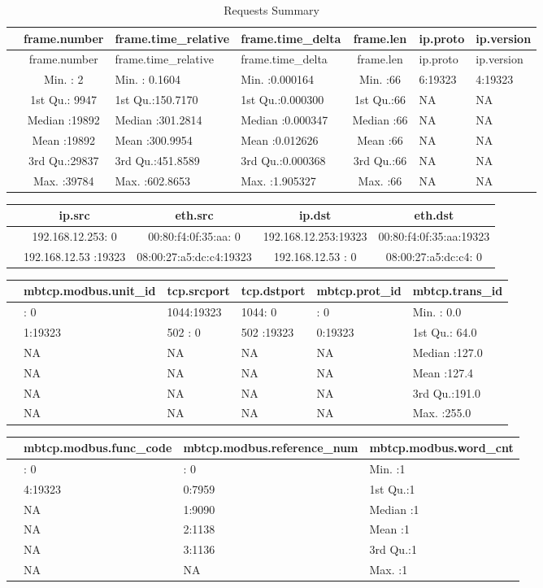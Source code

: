 \documentclass[11pt,a4paper]{article}
\begin{document}
\begin{longtable}[c]{@{}lcllcll@{}}
\caption{Requests Summary}\tabularnewline
\toprule
& frame.number & frame.time\_relative & frame.time\_delta & frame.len &
ip.proto & ip.version\tabularnewline
\midrule
\endfirsthead
\toprule
& frame.number & frame.time\_relative & frame.time\_delta & frame.len &
ip.proto & ip.version\tabularnewline
\midrule
\endhead
& Min. : 2 & Min. : 0.1604 & Min. :0.000164 & Min. :66 & 6:19323 &
4:19323\tabularnewline
& 1st Qu.: 9947 & 1st Qu.:150.7170 & 1st Qu.:0.000300 & 1st Qu.:66 & NA
& NA\tabularnewline
& Median :19892 & Median :301.2814 & Median :0.000347 & Median :66 & NA
& NA\tabularnewline
& Mean :19892 & Mean :300.9954 & Mean :0.012626 & Mean :66 & NA &
NA\tabularnewline
& 3rd Qu.:29837 & 3rd Qu.:451.8589 & 3rd Qu.:0.000368 & 3rd Qu.:66 & NA
& NA\tabularnewline
& Max. :39784 & Max. :602.8653 & Max. :1.905327 & Max. :66 & NA &
NA\tabularnewline
\bottomrule
\end{longtable}

\begin{longtable}[c]{@{}lcccc@{}}
\toprule
& ip.src & eth.src & ip.dst & eth.dst\tabularnewline
\midrule
\endhead
& 192.168.12.253: 0 & 00:80:f4:0f:35:aa: 0 & 192.168.12.253:19323 &
00:80:f4:0f:35:aa:19323\tabularnewline
& 192.168.12.53 :19323 & 08:00:27:a5:dc:c4:19323 & 192.168.12.53 : 0 &
08:00:27:a5:dc:c4: 0\tabularnewline
\bottomrule
\end{longtable}

\begin{longtable}[c]{@{}llllll@{}}
\toprule
& mbtcp.modbus.unit\_id & tcp.srcport & tcp.dstport & mbtcp.prot\_id &
mbtcp.trans\_id\tabularnewline
\midrule
\endhead
& : 0 & 1044:19323 & 1044: 0 & : 0 & Min. : 0.0\tabularnewline
& 1:19323 & 502 : 0 & 502 :19323 & 0:19323 & 1st Qu.:
64.0\tabularnewline
& NA & NA & NA & NA & Median :127.0\tabularnewline
& NA & NA & NA & NA & Mean :127.4\tabularnewline
& NA & NA & NA & NA & 3rd Qu.:191.0\tabularnewline
& NA & NA & NA & NA & Max. :255.0\tabularnewline
\bottomrule
\end{longtable}

\begin{longtable}[c]{@{}llll@{}}
\toprule
& mbtcp.modbus.func\_code & mbtcp.modbus.reference\_num &
mbtcp.modbus.word\_cnt\tabularnewline
\midrule
\endhead
& : 0 & : 0 & Min. :1\tabularnewline
& 4:19323 & 0:7959 & 1st Qu.:1\tabularnewline
& NA & 1:9090 & Median :1\tabularnewline
& NA & 2:1138 & Mean :1\tabularnewline
& NA & 3:1136 & 3rd Qu.:1\tabularnewline
& NA & NA & Max. :1\tabularnewline
\bottomrule
\end{longtable}
\end{document}
